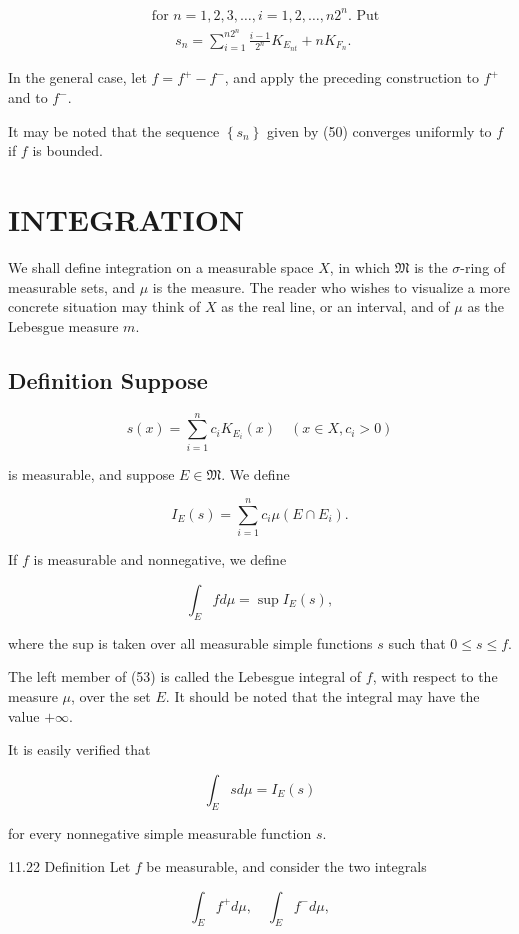 \documentclass[10pt]{article}
\begin{document}
$$
\begin{aligned}
& \text { for } n=1,2,3, \ldots, i=1,2, \ldots, n 2^{n} \text {. Put } \\
& \qquad s_{n}=\sum_{i=1}^{n 2^{n}} \frac{i-1}{2^{n}} K_{E_{n t}}+n K_{F_{n}} .
\end{aligned}
$$

In the general case, let $f=f^{+}-f^{-}$, and apply the preceding construction to $f^{+}$and to $f^{-}$.

It may be noted that the sequence $\left\{s_{n}\right\}$ given by (50) converges uniformly to $f$ if $f$ is bounded.

\section{INTEGRATION}
We shall define integration on a measurable space $X$, in which $\mathfrak{M}$ is the $\sigma$-ring of measurable sets, and $\mu$ is the measure. The reader who wishes to visualize a more concrete situation may think of $X$ as the real line, or an interval, and of $\mu$ as the Lebesgue measure $m$.

\subsection{Definition Suppose}
$$
s(x)=\sum_{i=1}^{n} c_{i} K_{E_{i}}(x) \quad\left(x \in X, c_{i}>0\right)
$$

is measurable, and suppose $E \in \mathfrak{M}$. We define

$$
I_{E}(s)=\sum_{i=1}^{n} c_{i} \mu\left(E \cap E_{i}\right) .
$$

If $f$ is measurable and nonnegative, we define

$$
\int_{E} f d \mu=\sup I_{E}(s),
$$

where the sup is taken over all measurable simple functions $s$ such that $0 \leq s \leq f$.

The left member of (53) is called the Lebesgue integral of $f$, with respect to the measure $\mu$, over the set $E$. It should be noted that the integral may have the value $+\infty$.

It is easily verified that

$$
\int_{E} s d \mu=I_{E}(s)
$$

for every nonnegative simple measurable function $s$.

11.22 Definition Let $f$ be measurable, and consider the two integrals

$$
\int_{E} f^{+} d \mu, \quad \int_{E} f^{-} d \mu,
$$
\end{document}
